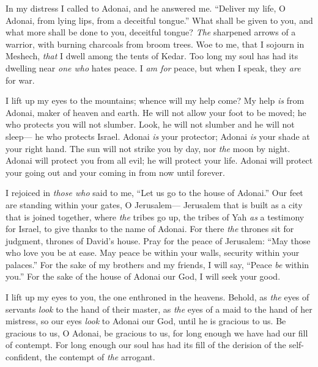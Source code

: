 \begin{biblechapter} %
 In my distress I called to Adonai, 
and he answered me.
\verse “Deliver my life, O Adonai, from lying lips, 
from a deceitful tongue.”
\verse What shall be given to you, 
and what more shall be done to you, 
deceitful tongue?
\verse \textit{The} sharpened arrows of a warrior, 
with burning charcoals from broom trees.
\verse Woe to me, that I sojourn in Meshech, 
\textit{that} I dwell among the tents of Kedar.
\verse Too long my soul has had its dwelling 
near \textit{one who} hates peace.
\verse I \textit{am for} peace, but when I speak, 
they \textit{are} for war.
\end{biblechapter}

\begin{biblechapter} %
 I lift up my eyes to the mountains; 
whence will my help come?
\verse My help \textit{is} from Adonai, 
maker of heaven and earth.
\verse He will not allow your foot to be moved; 
he who protects you will not slumber.
\verse Look, he will not slumber and he will not sleep— 
he who protects Israel.
\verse Adonai \textit{is} your protector; 
Adonai \textit{is} your shade at your right hand.
\verse The sun will not strike you by day, 
nor \textit{the} moon by night.
\verse Adonai will protect you from all evil; 
he will protect your life.
\verse Adonai will protect your going out and your coming in 
from now until forever.
\end{biblechapter}

\begin{biblechapter} %
 I rejoiced in \textit{those who} said to me, 
“Let us go to the house of Adonai.”
\verse Our feet are standing 
within your gates, O Jerusalem—
\verse Jerusalem that is built 
as a city that is joined together,
\verse where \textit{the} tribes go up, 
the tribes of Yah \textit{as} a testimony for Israel, 
to give thanks to the name of Adonai.
\verse For there \textit{the} thrones sit for judgment, 
thrones of David’s house.
\verse Pray for the peace of Jerusalem: 
“May those who love you be at ease.
\verse May peace be within your walls, 
security within your palaces.”
\verse For the sake of my brothers and my friends, 
I will say, “Peace \textit{be} within you.”
\verse For the sake of the house of Adonai our God, 
I will seek your good.
\end{biblechapter}

\begin{biblechapter} %
 I lift up my eyes to you, 
the one enthroned in the heavens.
\verse Behold, as \textit{the} eyes of servants 
\textit{look} to the hand of their master, 
as \textit{the} eyes of a maid to the hand of her mistress, 
so our eyes \textit{look} to Adonai our God, 
until he is gracious to us.
\verse Be gracious to us, O Adonai, be gracious to us, 
for long enough we have had our fill of contempt.
\verse For long enough our soul has had its fill of 
the derision of the self-confident, 
the contempt of \textit{the} arrogant.
\end{biblechapter}


